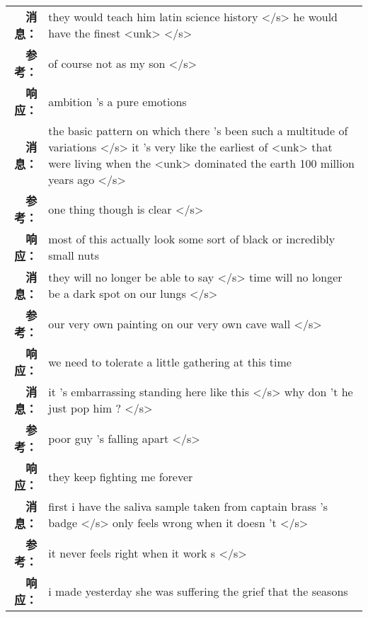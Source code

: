 \begin{tabularx}{0.8\textwidth}{@{}rX@{}}%
\toprule%
\midrule%
\textbf{消息：}&they would teach him latin science history </s> he would have the finest <unk>  </s>\\%
\textbf{参考：}& of course not as my son </s>\\%
\textbf{响应：}&ambition 's a pure emotions\\%
\midrule%
\textbf{消息：}&the basic pattern on which there 's been such a multitude of variations </s> it 's very like the earliest of <unk> that were living when the <unk> dominated the earth 100 million years ago  </s>\\%
\textbf{参考：}& one thing though is clear </s>\\%
\textbf{响应：}&most of this actually look some sort of black or incredibly small nuts\\%
\midrule%
\textbf{消息：}&they will no longer be able to say </s> time will no longer be a dark spot on our lungs  </s>\\%
\textbf{参考：}& our very own painting on our very own cave wall </s>\\%
\textbf{响应：}&we need to tolerate a little gathering at this time\\%
\midrule%
\textbf{消息：}&it 's embarrassing standing here like this </s> why don 't he just pop him ?  </s>\\%
\textbf{参考：}& poor guy 's falling apart </s>\\%
\textbf{响应：}&they keep fighting me forever\\%
\midrule%
\textbf{消息：}&first i have the saliva sample taken from captain brass 's badge </s> only feels wrong when it doesn 't  </s>\\%
\textbf{参考：}& it never feels right when it work s </s>\\%
\textbf{响应：}&i made yesterday she was suffering the grief that the seasons\\%
\midrule\bottomrule%
%
\end{tabularx}
